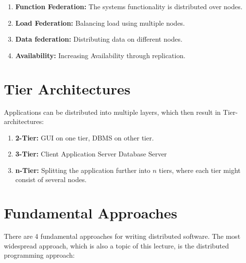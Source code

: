 \begin{enumerate}
    \item \textbf{Function Federation:} The systems functionality is distributed over nodes.
    \item \textbf{Load Federation:} Balancing load using multiple nodes.
    \item \textbf{Data federation:} Distributing data on different nodes.
    \item \textbf{Availability:} Increasing Availability through replication.
\end{enumerate}

\section{Tier Architectures}

Applications can be distributed into multiple layers, which then result in Tier-architectures:

\begin{enumerate}
    \item \textbf{2-Tier:} \ac{GUI} on one tier, DBMS on other tier.
    \item \textbf{3-Tier:} Client \textendash{} Application Server \textendash{} Database Server
    \item \textbf{n-Tier:} Splitting the application further into $n$ tiers, where each tier might consist of several nodes.
\end{enumerate}

\section{Fundamental Approaches}

There are 4 fundamental approaches for writing distributed software. The most widespread approach, which is also a topic of this lecture, is the distributed programming approach:

